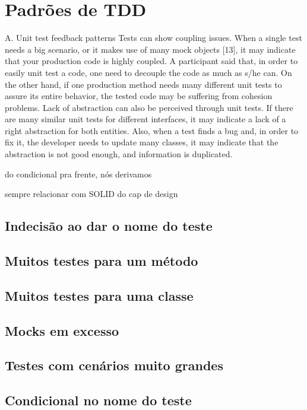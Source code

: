 \section{Padrões de TDD}
A. Unit test feedback patterns
Tests can show coupling issues. When a single test needs a big scenario, or it makes use of many mock objects [13], it may indicate that your production code is highly coupled. A participant said that, in order to easily unit test a code, one need to decouple the code as much as s/he can.
On the other hand, if one production method needs many different unit tests to assure its entire behavior, the tested code may be suffering from cohesion problems.
Lack of abstraction can also be perceived through unit tests. If there are many similar unit tests for different interfaces, it may indicate a lack of a right abstraction for both entities. Also, when a test finds a bug and, in order to fix it, the developer needs to update many classes, it may indicate that the abstraction is not good enough, and information is duplicated.

do condicional pra frente, nós derivamos

sempre relacionar com SOLID do cap de design

\subsection{Indecisão ao dar o nome do teste}

\subsection{Muitos testes para um método}

\subsection{Muitos testes para uma classe}

\subsection{Mocks em excesso}

\subsection{Testes com cenários muito grandes}

\subsection{Condicional no nome do teste}


